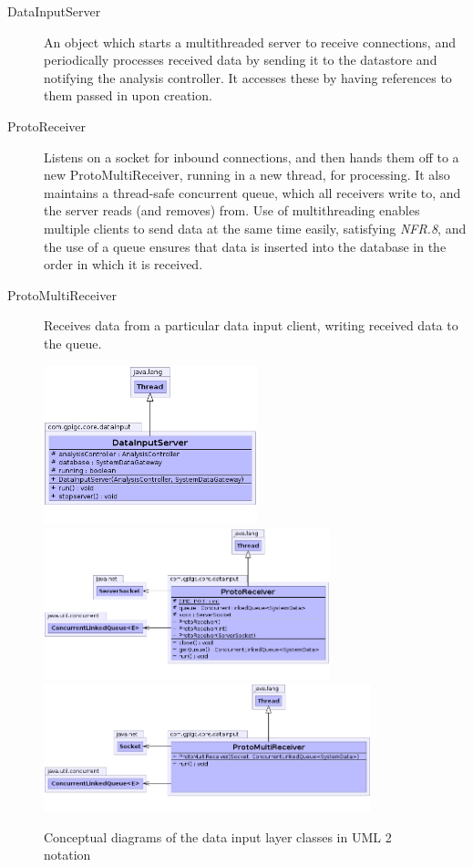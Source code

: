 \documentclass[10pt,a4paper]{article}
\newcommand{\nfrit}[1]{\textit{NFR.#1}}
\begin{document}
\begin{description}
  \item[DataInputServer] An object which starts a multithreaded
    server to receive connections, and periodically processes
    received data by sending it to the datastore and notifying the
    analysis controller. It accesses these by having references to them
    passed in upon creation.

  \item[ProtoReceiver] Listens on a socket for inbound connections,
    and then hands them off to a new ProtoMultiReceiver, running in a
    new thread, for processing. It also maintains a thread-safe
    concurrent queue, which all receivers write to, and the
    server reads (and removes) from. Use of multithreading
    enables multiple clients to send data at the same time easily, satisfying \nfrit{8}, and
    the use of a queue ensures that data is inserted into the database
    in the order in which it is received.

  \item[ProtoMultiReceiver] Receives data from a particular data input
    client, writing received data to the queue.
\end{description}

\begin{figure}[h!]
  \centering
  \includegraphics[width=6.2cm]{images/DataInputLayer/DataInputServer.png}
  \includegraphics[width=8.3cm]{images/DataInputLayer/ProtoReceiver.png}
  \includegraphics[width=9.5cm]{images/DataInputLayer/ProtoMultiReceiver.png}
  \caption{Conceptual diagrams of the data input layer classes in 
UML 2 notation}
  \label{fig:dataInputLayer}
\end{figure}
\end{document}

